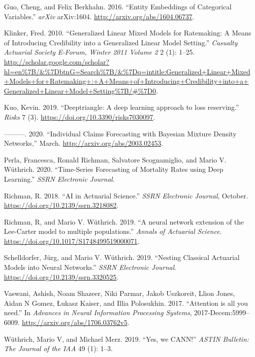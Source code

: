 \documentclass{article}
\newlength{\cslhangindent}
\newenvironment{cslreferences}%
  {\setlength{\parindent}{0pt}%
  \everypar{\setlength{\hangindent}{\cslhangindent}}\ignorespaces}%
  {\par}
\begin{document}
\begin{cslreferences}
\leavevmode\hypertarget{ref-Guo2016}{}%
Guo, Cheng, and Felix Berkhahn. 2016. ``Entity Embeddings of Categorical
Variables.'' \emph{arXiv} arXiv:1604.
\url{http://arxiv.org/abs/1604.06737}.

\leavevmode\hypertarget{ref-Klinker2010}{}%
Klinker, Fred. 2010. ``Generalized Linear Mixed Models for Ratemaking: A
Means of Introducing Credibility into a Generalized Linear Model
Setting.'' \emph{Casualty Actuarial Society E-Forum, Winter 2011 Volume
2} 2 (1): 1--25.
\url{http://scholar.google.com/scholar?hl=en\%7B/\&\%7DbtnG=Search\%7B/\&\%7Dq=intitle:Generalized+Linear+Mixed+Models+for+Ratemaking+:+A+Means+of+Introducing+Credibility+into+a+Generalized+Linear+Model+Setting\%7B/\#\%7D0}.

\leavevmode\hypertarget{ref-Kuo2019}{}%
Kuo, Kevin. 2019. ``Deeptriangle: A deep learning approach to loss
reserving.'' \emph{Risks} 7 (3).
\url{https://doi.org/10.3390/risks7030097}.

\leavevmode\hypertarget{ref-Kuo2020}{}%
---------. 2020. ``Individual Claims Forecasting with Bayesian Mixture
Density Networks,'' March. \url{http://arxiv.org/abs/2003.02453}.

\leavevmode\hypertarget{ref-Richman2020}{}%
Perla, Francesca, Ronald Richman, Salvatore Scognamiglio, and Mario V.
Wüthrich. 2020. ``Time-Series Forecasting of Mortality Rates using Deep
Learning.'' \emph{SSRN Electronic Journal}.

\leavevmode\hypertarget{ref-Richman2018}{}%
Richman, R. 2018. ``AI in Actuarial Science.'' \emph{SSRN Electronic
Journal}, October. \url{https://doi.org/10.2139/ssrn.3218082}.

\leavevmode\hypertarget{ref-Richman2019d}{}%
Richman, R, and Mario V. Wüthrich. 2019. ``A neural network extension of
the Lee-Carter model to multiple populations.'' \emph{Annals of
Actuarial Science}. \url{https://doi.org/10.1017/S1748499519000071}.

\leavevmode\hypertarget{ref-schelldorfer2019nesting}{}%
Schelldorfer, Jürg, and Mario V. Wüthrich. 2019. ``Nesting Classical
Actuarial Models into Neural Networks.'' \emph{SSRN Electronic Journal}.
\url{https://doi.org/10.2139/ssrn.3320525}.

\leavevmode\hypertarget{ref-Vaswani2017}{}%
Vaswani, Ashish, Noam Shazeer, Niki Parmar, Jakob Uszkoreit, Llion
Jones, Aidan N Gomez, Łukasz Kaiser, and Illia Polosukhin. 2017.
``Attention is all you need.'' In \emph{Advances in Neural Information
Processing Systems}, 2017-Decem:5999--6009.
\url{http://arxiv.org/abs/1706.03762v5}.

\leavevmode\hypertarget{ref-wuthrich2019yes}{}%
Wüthrich, Mario V, and Michael Merz. 2019. ``Yes, we CANN!'' \emph{ASTIN
Bulletin: The Journal of the IAA} 49 (1): 1--3.
\end{cslreferences}



\end{document}

